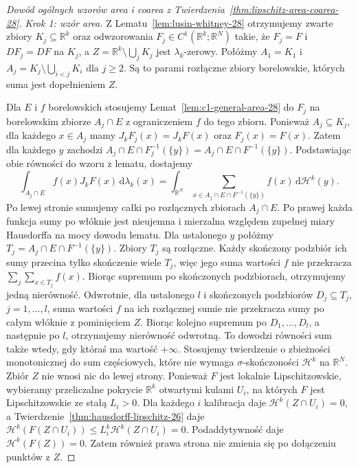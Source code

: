 \begin{proof}[Dowód ogólnych wzorów area i coarea z
Twierdzenia~\ref{thm:lipschitz-area-coarea-28}]
\emph{Krok 1: wzór area.}
Z Lematu~\ref{lem:lusin-whitney-28} otrzymujemy
zwarte zbiory $K_j\subseteq\mathbb R^k$ oraz
odwzorowania $F_j\in C^1(\mathbb R^k;\mathbb R^N)$
takie, że $F_j=F$ i $DF_j=DF$ na $K_j$, a
$Z=\mathbb R^k\setminus\bigcup_jK_j$ jest
$\lambda_k$-zerowy. Połóżmy
$A_1=K_1$ i
$A_j=K_j\setminus\bigcup_{i<j}K_i$ dla $j\ge2$.
Są to parami rozłączne zbiory borelowskie,
których suma jest dopełnieniem $Z$.

Dla $E$ i $f$ borelowskich stosujemy
Lemat~\ref{lem:c1-general-area-28} do
$F_j$ na borelowskim zbiorze $A_j\cap E$
z ograniczeniem $f$ do tego zbioru. Ponieważ
$A_j\subseteq K_j$, dla każdego $x\in A_j$ mamy
$J_kF_j(x)=J_kF(x)$ oraz $F_j(x)=F(x)$.
Zatem dla każdego $y$ zachodzi
$A_j\cap E\cap F_j^{-1}(\{y\})
=A_j\cap E\cap F^{-1}(\{y\})$.
Podstawiając obie równości do wzoru z lematu, dostajemy
\[
 \int_{A_j\cap E}f(x)J_kF(x)\,\mathrm d\lambda_k(x)
 =\int_{\mathbb R^N}
 \sum_{x\in A_j\cap E\cap F^{-1}(\{y\})}f(x)
 \,\mathrm d\mathcal H^k(y).
\]
Po lewej stronie sumujemy całki po rozłącznych
zbiorach $A_j\cap E$. Po prawej każda funkcja
sumy po włóknie jest nieujemna i mierzalna
względem zupełnej miary Hausdorffa na mocy dowodu
lematu. Dla ustalonego $y$ połóżmy
$T_j=A_j\cap E\cap F^{-1}(\{y\})$.
Zbiory $T_j$ są rozłączne. Każdy skończony podzbiór
ich sumy przecina tylko skończenie wiele $T_j$,
więc jego suma wartości $f$ nie przekracza
$\sum_j\sum_{x\in T_j}f(x)$.
Biorąc supremum po skończonych podzbiorach, otrzymujemy
jedną nierówność. Odwrotnie, dla ustalonego $l$
i skończonych podzbiorów $D_j\subseteq T_j$,
$j=1,\ldots,l$, suma wartości $f$ na ich rozłącznej
sumie nie przekracza sumy po całym włóknie
z pominięciem $Z$. Biorąc kolejno supremum po
$D_1,\ldots,D_l$, a następnie po $l$, otrzymujemy
nierówność odwrotną. To dowodzi równości sum
także wtedy, gdy któraś ma wartość $+\infty$. Stosujemy twierdzenie
o zbieżności monotonicznej do sum częściowych,
które nie wymaga $\sigma$-skończoności $\mathcal H^k$
na $\mathbb R^N$.
Zbiór $Z$ nie wnosi nic do lewej strony.
Ponieważ $F$ jest lokalnie Lipschitzowskie,
wybieramy przeliczalne pokrycie $\mathbb R^k$
otwartymi kulami $U_i$, na których $F$ jest
Lipschitzowskie ze stałą $L_i>0$. Dla każdego $i$
kalibracja daje $\mathcal H^k(Z\cap U_i)=0$,
a Twierdzenie~\ref{thm:hausdorff-lipschitz-26} daje
$\mathcal H^k(F(Z\cap U_i))\le
L_i^k\mathcal H^k(Z\cap U_i)=0$.
Podaddytywność daje $\mathcal H^k(F(Z))=0$.
Zatem również prawa strona nie zmienia się
po dołączeniu punktów z $Z$.


\end{proof}
